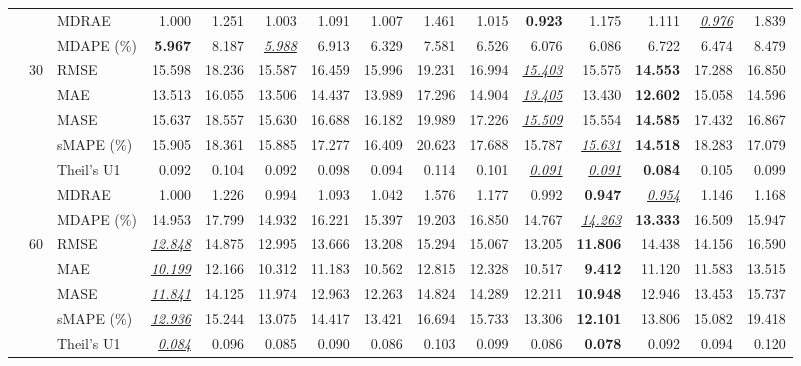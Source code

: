 \begin{table}[!htbp]
{\begin{tabular}{lllrrrrrrrrrrrr}
 &  & MDRAE & 1.000 & 1.251 & 1.003 & 1.091 & 1.007 & 1.461 & 1.015 & \textbf{0.923} & 1.175 & 1.111 & \underline{\textit{0.976}} & 1.839 \\
 &  & MDAPE (\%) & \textbf{5.967} & 8.187 & \underline{\textit{5.988}} & 6.913 & 6.329 & 7.581 & 6.526 & 6.076 & 6.086 & 6.722 & 6.474 & 8.479 \\
\cmidrule(lr){2-15}
 & 30 & RMSE & 15.598 & 18.236 & 15.587 & 16.459 & 15.996 & 19.231 & 16.994 & \underline{\textit{15.403}} & 15.575 & \textbf{14.553} & 17.288 & 16.850 \\
 &  & MAE & 13.513 & 16.055 & 13.506 & 14.437 & 13.989 & 17.296 & 14.904 & \underline{\textit{13.405}} & 13.430 & \textbf{12.602} & 15.058 & 14.596 \\
 &  & MASE & 15.637 & 18.557 & 15.630 & 16.688 & 16.182 & 19.989 & 17.226 & \underline{\textit{15.509}} & 15.554 & \textbf{14.585} & 17.432 & 16.867 \\
 &  & sMAPE (\%) & 15.905 & 18.361 & 15.885 & 17.277 & 16.409 & 20.623 & 17.688 & 15.787 & \underline{\textit{15.631}} & \textbf{14.518} & 18.283 & 17.079 \\
 &  & Theil's U1 & 0.092 & 0.104 & 0.092 & 0.098 & 0.094 & 0.114 & 0.101 & \underline{\textit{0.091}} & \underline{\textit{0.091}} & \textbf{0.084} & 0.105 & 0.099 \\
 &  & MDRAE & 1.000 & 1.226 & 0.994 & 1.093 & 1.042 & 1.576 & 1.177 & 0.992 & \textbf{0.947} & \underline{\textit{0.954}} & 1.146 & 1.168 \\
 &  & MDAPE (\%) & 14.953 & 17.799 & 14.932 & 16.221 & 15.397 & 19.203 & 16.850 & 14.767 & \underline{\textit{14.263}} & \textbf{13.333} & 16.509 & 15.947 \\
\cmidrule(lr){2-15}
 & 60 & RMSE & \underline{\textit{12.848}} & 14.875 & 12.995 & 13.666 & 13.208 & 15.294 & 15.067 & 13.205 & \textbf{11.806} & 14.438 & 14.156 & 16.590 \\
 &  & MAE & \underline{\textit{10.199}} & 12.166 & 10.312 & 11.183 & 10.562 & 12.815 & 12.328 & 10.517 & \textbf{9.412} & 11.120 & 11.583 & 13.515 \\
 &  & MASE & \underline{\textit{11.841}} & 14.125 & 11.974 & 12.963 & 12.263 & 14.824 & 14.289 & 12.211 & \textbf{10.948} & 12.946 & 13.453 & 15.737 \\
 &  & sMAPE (\%) & \underline{\textit{12.936}} & 15.244 & 13.075 & 14.417 & 13.421 & 16.694 & 15.733 & 13.306 & \textbf{12.101} & 13.806 & 15.082 & 19.418 \\
 &  & Theil's U1 & \underline{\textit{0.084}} & 0.096 & 0.085 & 0.090 & 0.086 & 0.103 & 0.099 & 0.086 & \textbf{0.078} & 0.092 & 0.094 & 0.120 \\

\end{tabular}}
\end{table}

